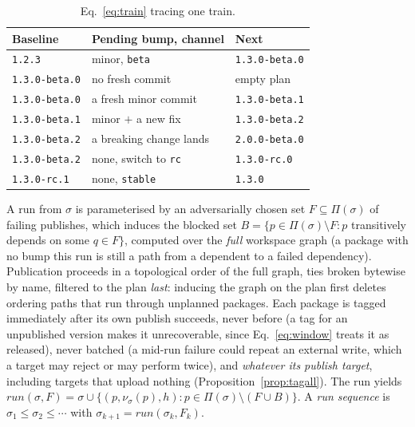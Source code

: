 \documentclass[sigconf,nonacm]{acmart}
\newcommand{\code}[1]{\texttt{#1}}
\begin{document}
\begin{table}[t]
\caption{Eq.~\ref{eq:train} tracing one train.}
\label{tab:train}
\small
\begin{tabular}{@{}lll@{}}
\toprule
Baseline & Pending bump, channel & Next \\
\midrule
\code{1.2.3}        & minor, \code{beta}          & \code{1.3.0-beta.0} \\
\code{1.3.0-beta.0} & no fresh commit             & empty plan \\
\code{1.3.0-beta.0} & a fresh minor commit        & \code{1.3.0-beta.1} \\
\code{1.3.0-beta.1} & minor $+$ a new fix         & \code{1.3.0-beta.2} \\
\code{1.3.0-beta.2} & a breaking change lands     & \code{2.0.0-beta.0} \\
\code{1.3.0-beta.2} & none, switch to \code{rc}   & \code{1.3.0-rc.0} \\
\code{1.3.0-rc.1}   & none, \code{stable}         & \code{1.3.0} \\
\bottomrule
\end{tabular}
\end{table}

\begin{definition}[run]
\label{def:run}
A run from $\sigma$ is parameterised by an adversarially chosen set
$F \subseteq \Pi(\sigma)$ of failing publishes, which induces the
blocked set
$B = \{p \in \Pi(\sigma) \setminus F : p$ transitively depends on some
$q \in F\}$, computed over the \emph{full} workspace graph (a package
with no bump this run is still a path from a dependent to a failed
dependency). Publication proceeds in a topological order of the full
graph, ties broken bytewise by name, filtered to the plan \emph{last}:
inducing the graph on the plan first deletes ordering paths that run
through unplanned packages. Each package is tagged immediately after its
own publish succeeds, never before (a tag for an unpublished version
makes it unrecoverable, since Eq.~\ref{eq:window} treats it as
released), never batched (a mid-run failure could repeat an external write,
which a target may reject or may perform twice), and \emph{whatever its publish target},
including targets that upload nothing
(Proposition~\ref{prop:tagall}). The run yields
$\mathit{run}(\sigma,F) = \sigma \cup \{(p, \nu_\sigma(p), h) : p \in
\Pi(\sigma) \setminus (F \cup B)\}$. A \emph{run sequence} is
$\sigma_1 \leq \sigma_2 \leq \cdots$ with $\sigma_{k+1} =
\mathit{run}(\sigma_k, F_k)$.
\end{definition}
\end{document}
